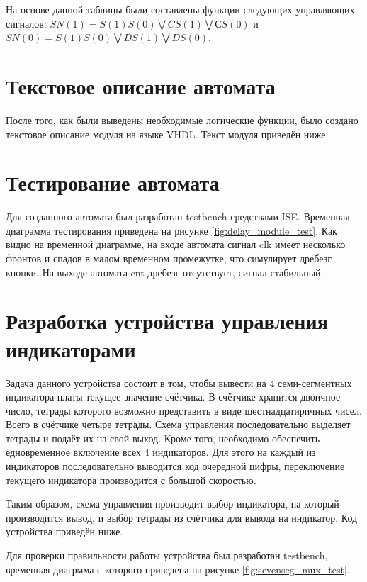\documentclass[a4paper, 14pt]{extarticle}
\begin{document}
    На основе данной таблицы были составлены функции следующих управляющих сигналов: $SN(1)=S(1)\overline{S(0)}\bigvee CS(1) \bigvee С\overline{S(0)}$ и $SN(0)=S(1)S(0) \bigvee DS(1) \bigvee \overline{D}S(0)$.

    \section{Текстовое описание автомата}
    После того, как были выведены необходимые логические функции, было создано текстовое описание модуля на языке VHDL. Текст модуля приведён ниже.

    \section{Тестирование автомата}
    Для созданного автомата был разработан testbench средствами ISE.
    Временная диаграмма тестирования приведена на рисунке \ref{fig:delay_module_test}.
    Как видно на временной диаграмме, на входе автомата сигнал clk имеет несколько фронтов и спадов в малом временном промежутке, что симулирует дребезг кнопки.
    На выходе автомата cnt дребезг отсутствует, сигнал стабильный.

    \section{Разработка устройства управления индикаторами}
    Задача данного устройства состоит в том, чтобы вывести на 4 семи-сегментных индикатора платы текущее значение счётчика.
    В счётчике хранится двоичное число, тетрады которого возможно представить в виде шестнадцатиричных чисел. Всего в счётчике четыре тетрады. Схема управления последовательно выделяет тетрады и подаёт их на свой выход.
    Кроме того, необходимо обеспечить едновременное включение всех 4 индикаторов. Для этого на каждый из индикаторов последовательно выводится код очередной цифры, переключение текущего индикатора производится с большой скоростью.
    
    Таким образом, схема управления производит выбор индикатора, на который производится вывод, и выбор тетрады из счётчика для вывода на индикатор. Код устройства приведён ниже.

    Для проверки правильности работы устройства был разработан testbench, временная диагрмма с которого приведена на рисунке \ref{fig:sevenseg_mux_test}.
\end{document}

